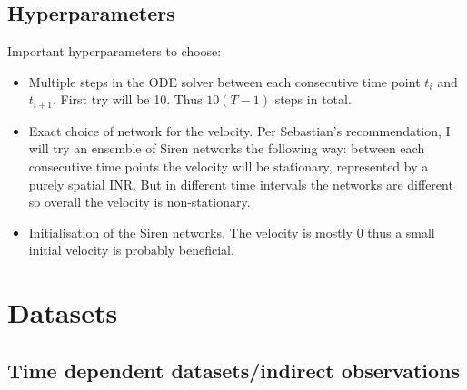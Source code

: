 \documentclass{article}
\begin{document}
\subsection{Hyperparameters}

Important hyperparameters to choose:
\begin{itemize}
    \item Multiple steps in the ODE solver between each consecutive time point $t_i$ and $t_{i+1}$. First try will be 10. Thus $10(T-1)$ steps in total.
    \item Exact choice of network for the velocity. Per Sebastian's recommendation, I will try an ensemble of Siren networks the following way: between each consecutive time points the velocity will be stationary, represented by a purely spatial INR. But in different time intervals the networks are different so overall the velocity is non-stationary.
    \item Initialisation of the Siren networks. The velocity is mostly 0 thus a small initial velocity is probably beneficial.
\end{itemize}


\section{Datasets}

\subsection{Time dependent datasets/indirect observations}
\end{document}
